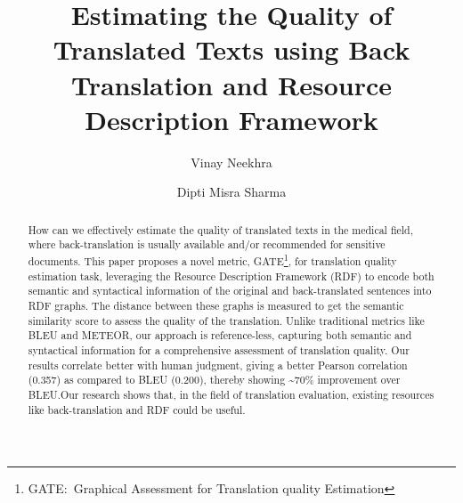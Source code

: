\documentclass[runningheads]{llncs}
\begin{document}
%
\title{Estimating the Quality of Translated Texts using Back Translation and Resource Description Framework}
%
%
\author{Vinay Neekhra\inst{} \and
Dipti Misra Sharma\inst{}}


%
%
\institute{
Language Technology Research Center (LTRC)\\ Kohli Center on Intelligent Systems (KCIS)\\
International Institute of Information Technology, Hyderabad, India
\email{vinay.neekhra@research.iiit.ac.in}\\ 
\email{dipti@iiit.ac.in}}
%
\maketitle              %
%
\begin{abstract}How can we effectively estimate the quality of translated texts in the medical field, where back-translation is usually available and/or recommended for sensitive documents. This paper proposes a novel metric, GATE\footnote{GATE:~Graphical Assessment for Translation quality Estimation}, for translation quality estimation task, leveraging the Resource Description Framework (RDF) to encode both semantic and syntactical information of the original and back-translated sentences into RDF graphs. The distance between these graphs is measured to get the semantic similarity score to assess the quality of the translation. Unlike traditional metrics like BLEU and METEOR, our approach is reference-less, capturing both semantic and syntactical information for a comprehensive assessment of translation quality. Our results correlate better with human judgment, giving a better Pearson correlation (0.357) as compared to BLEU (0.200), thereby showing \textasciitilde70\% improvement over BLEU.\@ Our research shows that, in the field of translation evaluation, existing resources like  back-translation  and RDF could be useful.

\end{abstract}
%
%
%
\end{document}
